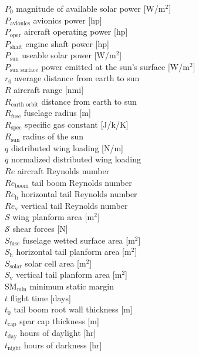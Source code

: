 \documentclass[]{aiaa-tc}%
\begin{document}
\begin{multicols}{2}
\begin{tabbing}
$P_{0}$ \> magnitude of available solar power [W/m$^2$] \\
$P_{\text{avionics}}$ \> avionics power [hp] \\
$P_{\text{oper}}$ \> aircraft operating power [hp] \\
$P_{\text{shaft}}$ \> engine shaft power [hp] \\
$P_{\text{sun}}$ \> useable solar power [W/m$^2$] \\
$P_{\text{sun surface}}$ \> power emitted at the sun's surface [W/m$^2$] \\
$r_0$ \> average distance from earth to sun \\
$R$ \> aircraft range [nmi] \\
$R_{\text{earth orbit}}$ \> distance from earth to sun \\
$R_{\text{fuse}}$ \> fuselage radius [m] \\
$R_{\text{spec}}$ \> specific gas constant [J/k/K] \\
$R_{\text{sun}}$ \> radius of the sun \\
$q$ \> distributed wing loading [N/m] \\
$\bar{q}$ \> normalized distributed wing loading \\
$Re$ \> aircraft Reynolds number \\
$Re_{\text{boom}}$ \> tail boom Reynolds number \\
$Re_{\text{h}}$ \> horizontal tail Reynolds number \\
$Re_{\text{v}}$ \> vertical tail Reynolds number \\
$S$ \> wing planform area [m$^2$]\\
$\mathcal{S}$ \> shear forces [N] \\
$S_{\text{fuse}}$ \> fuselage wetted surface area [m$^2$]\\
$S_{\text{h}}$ \> horizontal tail planform area [m$^2$]\\
$S_{\text{solar}}$ \> solar cell area [m$^2$]\\
$S_{\text{v}}$ \> vertical tail planform area [m$^2$]\\
$\text{SM}_{\text{min}}$ \> minimum static margin \\
$t$ \> flight time [days] \\
$t_0$ \> tail boom root wall thickness [m] \\
$t_{\text{cap}}$ \> spar cap thickness [m] \\
$t_{\text{day}}$ \> hours of daylight [hr] \\
$t_{\text{night}}$ \> hours of darkness [hr] \\

\end{tabbing}
\end{multicols}
\end{document}
